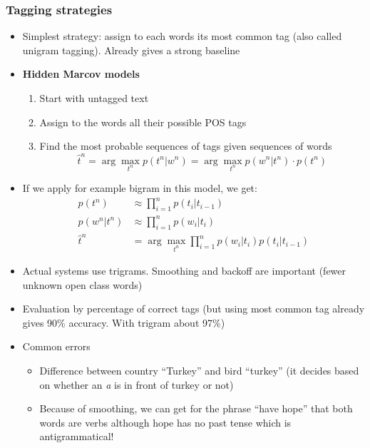 \subsubsection{Tagging strategies}
\begin{itemize}
	\item Simplest strategy: assign to each words its most common tag (also called unigram tagging). Already gives a strong baseline
	\item \textbf{Hidden Marcov models}
	\begin{enumerate}
		\item Start with untagged text
		\item Assign to the words all their possible POS tags
		\item Find the most probable sequences of tags given sequences of words
		$$\hat{t}^{n} = \arg\max_{t^{n}} p(t^{n} | w^{n}) = \arg\max_{t^{n}} p(w^{n}|t^{n})\cdot p(t^{n}) $$
	\end{enumerate}
	\item If we apply for example bigram in this model, we get:
	\begin{equation*}
	\begin{split}
	p(t^{n}) & \approx \prod_{i=1}^{n} p(t_i | t_{i-1})\\
	p(w^{n}|t^{n}) & \approx \prod_{i=1}^{n} p(w_i | t_i)\\
	\hat{t}^{n} & = \arg\max_{t^{n}} \prod_{i=1}^{n}p(w_i | t_i)p(t_i | t_{i-1})
	\end{split}
	\end{equation*}
	\item Actual systems use trigrams. Smoothing and backoff are important (fewer unknown open class words)
	\item Evaluation by percentage of correct tags (but using most common tag already gives 90\% accuracy. With trigram about 97\%)
	\item Common errors
	\begin{itemize}
		\item Difference between country ``Turkey'' and bird ``turkey'' (it decides based on whether an \textit{a} is in front of turkey or not)
		\item Because of smoothing, we can get for the phrase ``have hope'' that both words are verbs although hope has no past tense which is antigrammatical!
	\end{itemize}
\end{itemize}